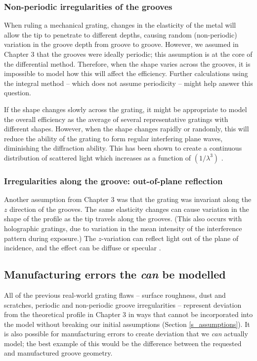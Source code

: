 \subsubsection{Non-periodic irregularities of the grooves}
When ruling a mechanical grating, changes in the elasticity of the metal will allow the tip to penetrate to different depths, causing random (non-periodic) variation in the groove depth from groove to groove.  However, we assumed in Chapter 3 that the grooves were ideally periodic; this assumption is at the core of the differential method.  Therefore, when the shape varies across the grooves, it is impossible to model how this will affect the efficiency.  Further calculations using the integral method -- which does not assume periodicity -- might help answer this question.

If the shape changes slowly across the grating, it might be appropriate to model the overall efficiency as the average of several representative gratings with different shapes.  However, when the shape changes rapidly or randomly, this will reduce the ability of the grating to form regular interfering plane waves, diminishing the diffraction ability.  This has been shown to create a continuous distribution of scattered light which increases as a function of $(1/\lambda^3)$ \cite{Sha78}.

\subsubsection{Irregularities along the groove: out-of-plane reflection}
Another assumption from Chapter 3 was that the grating was invariant along the $z$ direction of the grooves.  The same elasticity changes can cause variation in the shape of the profile as the tip travels along the grooves.  (This also occurs with holographic gratings, due to variation in the mean intensity of the interference pattern during exposure.)  The $z$-variation can reflect light out of the plane of incidence, and the effect can be diffuse or specular \cite{Pal05}.

\subsection{Manufacturing errors the \emph{can} be modelled}
All of the previous real-world grating flaws -- surface roughness, dust and scratches, periodic and non-periodic groove irregularities -- represent deviation from the theoretical profile in Chapter 3 in ways that cannot be incorporated into the model without breaking our initial assumptions (Section \ref{s_assumptions}).  It is also possible for manufacturing errors to create deviation that we \emph{can} actually model; the best example of this would be the difference between the requested and manufactured groove geometry.
